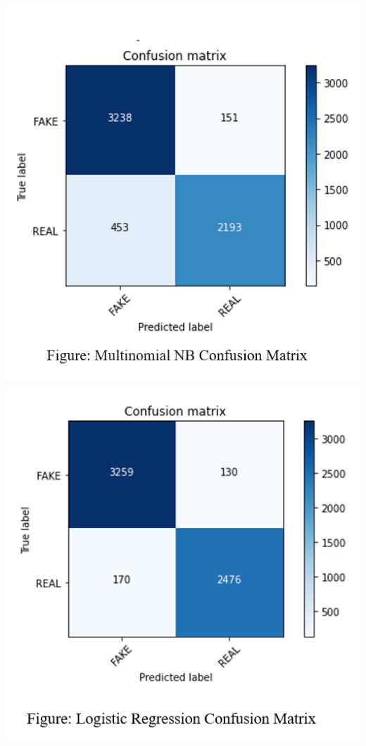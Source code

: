\documentclass[conference]{IEEEtran}
\begin{document}
\includegraphics[scale=0.45]{figF.png}
\includegraphics[scale=0.55]{figG.png}
\end{document}
